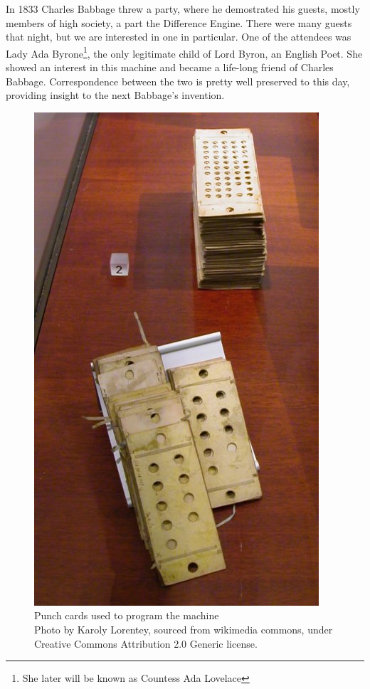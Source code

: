 \documentclass{report}
\begin{document}
            In 1833 Charles Babbage threw a party, where he demostrated his guests, mostly members of high society, a part the Difference Engine. There were many
            guests that night, but we are interested in one in particular. One of the attendees was Lady Ada Byrone\footnote{She later will be known as Countess Ada Lovelace},
            the only legitimate child of Lord Byron, an English Poet. She showed an interest in this machine and became a life-long friend of Charles Babbage.
            Correspondence between the two is pretty well preserved to this day, providing insight to the next Babbage's invention. \par

            \begin{figure}
                \centering
                \includegraphics[scale=0.8]{images/misc/analytical_engine_punch_cards.jpg}
                \caption{Punch cards used to program the machine\\\tiny{Photo by Karoly Lorentey, sourced from wikimedia commons, under  Creative Commons Attribution 2.0 Generic license.}}
            \end{figure}
\end{document}
